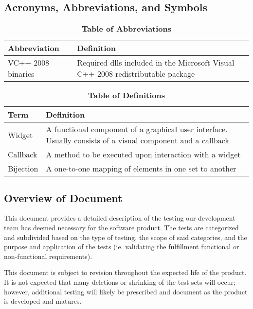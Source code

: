 \documentclass[12pt, titlepage]{article}
\begin{document}
	\subsection{Acronyms, Abbreviations, and Symbols}
	
	\begin{table}[hbp]
		\caption{\textbf{Table of Abbreviations}} \label{AbbrTable}
		\begin{tabularx}{\textwidth}{p{3cm}X}
			\toprule
			\textbf{Abbreviation} & \textbf{Definition} \\
			\midrule
			VC++ 2008 \newline binaries & Required dlls included in the
			Microsoft Visual C++ 2008 redistributable package\\
			\bottomrule
		\end{tabularx}
	\end{table}
	\begin{table}[!htbp]
		\caption{\textbf{Table of Definitions}} \label{DefTable}
		\begin{tabularx}{\textwidth}{p{3cm}X}
			\toprule
			\textbf{Term} & \textbf{Definition}\\
			\midrule
			Widget & A functional component of a graphical user interface. 
			Usually	consists of a visual component and a callback\\
			Callback & A method to be executed upon interaction with a widget\\
			Bijection & A one-to-one mapping of elements in one set to another\\
			\bottomrule
		\end{tabularx}
	\end{table}	
	\subsection{Overview of Document}
	\indent \indent This document provides a detailed description of the 
	testing our development team has deemed necessary for the software product. 
	The tests are categorized and subdivided based on the type of testing, the 
	scope of said categories, and the purpose and application of the tests (ie. 
	validating the fulfillment functional or non-functional requirements).\par
	This document is subject to revision throughout the expected life of the 
	product. It is not expected that many deletions or shrinking of the test 
	sets will occur; however, additional testing will likely be prescribed and 
	document as the product is developed and matures.
	
\end{document}

